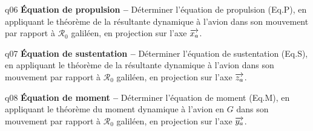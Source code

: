 \begin{multicols}{2}
{\begin{question}{q06}
\textbf{Équation de propulsion -- }
Déterminer l’équation de propulsion (Eq.P), en appliquant le théorème de la résultante
dynamique à l’avion dans son mouvement par rapport à $\mathcal{R}_0$ galiléen, en projection sur l’axe $\overrightarrow{x_a}$.
\ifprof
\begin{corrige}
\end{corrige}
\else
\fi
\begin{reponses}
\end{reponses} \end{question}}
  
{\begin{question}{q07}
\textbf{Équation de sustentation -- }
Déterminer l’équation de sustentation (Eq.S), en appliquant le théorème de la résultante
dynamique à l’avion dans son mouvement par rapport à $\mathcal{R}_0$ galiléen, en projection sur l’axe $\overrightarrow{z_a}$.
\ifprof
\begin{corrige}
\end{corrige}
\else
\fi
\begin{reponses}
\end{reponses} \end{question}}
  
  
{\begin{question}{q08}
\textbf{Équation de moment -- }
Déterminer l’équation de moment (Eq.M), en appliquant le théorème du moment
dynamique à l’avion en $G$ dans son mouvement par rapport à $\mathcal{R}_0$ galiléen, en projection sur l’axe $\overrightarrow{y_a}$.
\ifprof
\begin{corrige}
\end{corrige}
\else
\fi
\begin{reponses}
\end{reponses} \end{question}}
  

\end{multicols}
